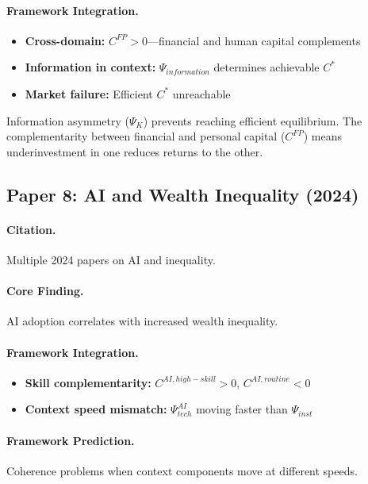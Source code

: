 \paragraph{Framework Integration.}
\begin{itemize}
  \item \textbf{Cross-domain:} $C^{FP} > 0$---financial and human capital complements
  \item \textbf{Information in context:} $\Psi_{information}$ determines achievable $C^*$
  \item \textbf{Market failure:} Efficient $C^*$ unreachable
\end{itemize}

\begin{tcolorbox}[colback=yellow!5!white, colframe=yellow!75!black,
    title=EBF Insight: Human Capital]
Information asymmetry ($\Psi_K$) prevents reaching efficient equilibrium.
The complementarity between financial and personal capital ($C^{FP}$)
means underinvestment in one reduces returns to the other.
\end{tcolorbox}


\subsection{Paper 8: AI and Wealth Inequality (2024)}

\paragraph{Citation.}
Multiple 2024 papers on AI and inequality.

\paragraph{Core Finding.}
AI adoption correlates with increased wealth inequality.

\paragraph{Framework Integration.}
\begin{itemize}
  \item \textbf{Skill complementarity:} $C^{AI,high-skill} > 0$, $C^{AI,routine} < 0$
  \item \textbf{Context speed mismatch:} $\Psi_{tech}^{AI}$ moving faster than $\Psi_{inst}$
\end{itemize}

\paragraph{Framework Prediction.}
Coherence problems when context components move at different speeds.

